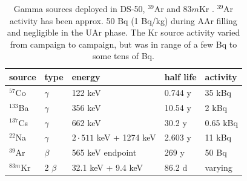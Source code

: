 \begin{table}[htbp]
\centering
\caption{Gamma sources deployed in DS-50, $^{39}$Ar and $83m$Kr \cite{Lippincott:2010jb}. $^{39}$Ar activity has been approx. 50 Bq (1 Bq/kg) during AAr filling and negligible in the UAr phase. The Kr source activity varied from campaign to campaign, but was in range of a few Bq to some tens of Bq.} %
\centering
\begin{tabular}{|l|l|l|l|l|}
\hline
\textbf{source} & \textbf{type} & \textbf{energy} & \textbf{half life} & \textbf{activity} \\ \hline
$^{57}$Co & $\gamma$ & 122 keV & 0.744 y  & 35 kBq \\ \hline
$^{133}$Ba & $\gamma$ & 356 keV & 10.54 y & 2 kBq \\ \hline
$^{137}$Cs & $\gamma$ & 662 keV & 30.2 y & 0.65 kBq \\ \hline
$^{22}$Na & $\gamma$ & $2\cdot 511$ keV + 1274 keV & 2.603 y & 11 kBq \\ \hline\hline
$^{39}$Ar & $\beta$ &  565 keV endpoint& 269 y  & 50 Bq\\ \hline
$^{83m}$Kr & 2 $\beta$ &  32.1 keV + 9.4 keV & 86.2 d & varying\\ \hline
\end{tabular}
\label{tbl:GammaSources}
\end{table}



